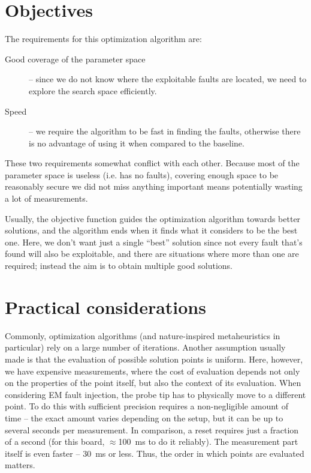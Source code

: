 \documentclass[times, utf8, diplomski]{fer}
\begin{document}
\section{Objectives}\label{sec:objectives}
The requirements for this optimization algorithm are:
\begin{description}
    \item[Good coverage of the parameter space] -- since we do not know where the
          exploitable faults are located, we need to explore the search space efficiently.
    \item[Speed] -- we require the algorithm to be fast in finding the faults, otherwise
          there is no advantage of using it when compared to the baseline.
\end{description}

These two requirements somewhat conflict with each other. Because most of the
parameter space is useless (i.e. has no faults), covering enough space to be
reasonably secure we did not miss anything important means potentially wasting
a lot of measurements.

Usually, the objective function guides the optimization algorithm towards better
solutions, and the algorithm ends when it finds what it considers to be the best
one. Here, we don't want just a single ``best'' solution since not every fault
that's found will also be exploitable, and there are situations where more than
one are required; instead the aim is to obtain multiple good solutions.



\section{Practical considerations}\label{sec:practical_considerations}
Commonly, optimization algorithms (and nature-inspired metaheuristics in
particular) rely on a large number of iterations. Another assumption usually
made is that the evaluation of possible solution points is uniform. Here,
however, we have expensive measurements, where the cost of evaluation depends
not only on the properties of the point itself, but also the context of its
evaluation.
%
When considering EM fault injection, the probe tip has to physically move to
a different point. To do this with sufficient precision requires a non-negligible
amount of time -- the exact amount varies depending on the setup, but it can be
up to several seconds per measurement. In comparison, a reset requires just a
fraction of a second (for this board, $\approx$\SI{100}{\milli\second} to do it
reliably). The measurement part itself is even faster -- \SI{30}{\milli\second}
or less. Thus, the order in which points are evaluated matters.
\end{document}
